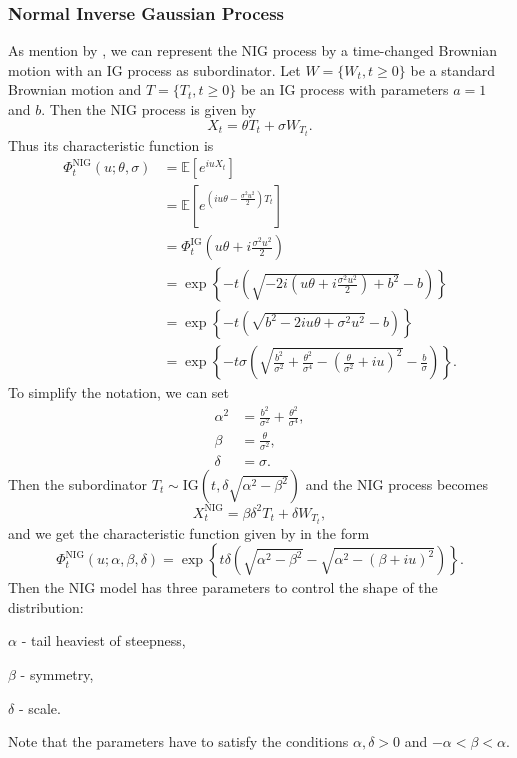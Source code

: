 \subsubsection*{Normal Inverse Gaussian Process}
As mention by \citeauthor{Gem02} \citeyearpar{Gem02}, we can represent the NIG process by a time-changed Brownian motion with an IG process as subordinator. Let $W=\{W_t,t\geq0\}$ be a standard Brownian motion and $T=\{T_t,t\geq0\}$ be an IG process with parameters $a=1$ and $b$. Then the NIG process is given by
$$X_t = \theta T_t + \sigma W_{T_t}.$$
Thus its characteristic function is
\begin{align*}
\Phi_t^\text{NIG}(u;\theta,\sigma) &= \mathbb{E}\left[e^{iuX_t}\right]\\
&=\mathbb{E}\left[e^{\left(iu\theta -\frac{\sigma^2 u^2}{2}\right)T_t}\right]\\
&=\Phi^\text{IG}_t\left(u\theta +i\frac{\sigma^2 u^2}{2}\right)\\
&= \exp\left\{-t\left(\sqrt{-2i\left(u\theta +i\frac{\sigma^2 u^2}{2}\right)+b^2}-b\right)\right\}\\
&=\exp\left\{-t\left(\sqrt{b^2-2iu\theta+\sigma^2u^2}-b\right)\right\}\\
&=\exp\left\{-t\sigma\left(\sqrt{\frac{b^2}{\sigma^2}+\frac{\theta^2}{\sigma^4}-\left(\frac{\theta}{\sigma^2}+iu\right)^2}-\frac{b}{\sigma}\right)\right\}.
\end{align*}
To simplify the notation, we can set
\begin{align*}
\alpha^2 &= \frac{b^2}{\sigma^2}+\frac{\theta^2}{\sigma^4},\\ 
\beta &= \frac{\theta}{\sigma^2},\\
\delta &= \sigma.
\end{align*}
Then the subordinator $T_t\sim \text{IG}\left(t,\delta \sqrt{\alpha^2-\beta^2}\right)$ and the NIG process becomes
$$X_t^\text{NIG} = \beta\delta^2 T_t + \delta W_{T_t},$$
and we get the characteristic function given by \citeauthor{Bar97a} \citeyearpar{Bar97a} in the form
$$\Phi_t^\text{NIG}(u;\alpha,\beta,\delta) = \exp\left\{t\delta\left(\sqrt{\alpha^2-\beta^2}-\sqrt{\alpha^2-(\beta+iu)^2}\right)\right\}.$$
Then the NIG model has three parameters to control the shape of the distribution:
\begin{my_list_item}
\item $\alpha$ - tail heaviest of steepness,
\item $\beta$ - symmetry,
\item $\delta$ - scale.
\end{my_list_item}
Note that the parameters have to satisfy the conditions $\alpha,\delta>0$ and $-\alpha<\beta<\alpha$.

